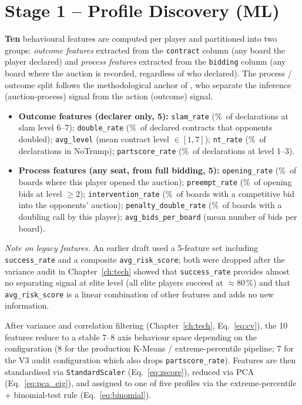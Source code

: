 \documentclass[11pt, a4paper, oneside, openany]{report}
\begin{document}
\section{Stage 1 -- Profile Discovery (ML)}

\textbf{Ten} behavioural features are computed per player and partitioned into two groups: \emph{outcome features} extracted from the \texttt{contract} column (any board the player declared) and \emph{process features} extracted from the \texttt{bidding} column (any board where the auction is recorded, regardless of who declared). The process / outcome split follows the methodological anchor of \citet{rong2019competitive}, who separate the inference (auction-process) signal from the action (outcome) signal.

\begin{itemize}[leftmargin=*]
    \item \textbf{Outcome features (declarer only, 5):}
      \texttt{slam\_rate} (\%\ of declarations at slam level 6--7);
      \texttt{double\_rate} (\%\ of declared contracts that opponents doubled);
      \texttt{avg\_level} (mean contract level $\in [1,7]$);
      \texttt{nt\_rate} (\%\ of declarations in NoTrump);
      \texttt{partscore\_rate} (\%\ of declarations at level 1--3).
    \item \textbf{Process features (any seat, from full bidding, 5):}
      \texttt{opening\_rate} (\%\ of boards where this player opened the auction);
      \texttt{preempt\_rate} (\%\ of opening bids at level $\geq 2$);
      \texttt{intervention\_rate} (\%\ of boards with a competitive bid into the opponents' auction);
      \texttt{penalty\_double\_rate} (\%\ of boards with a doubling call by this player);
      \texttt{avg\_bids\_per\_board} (mean number of bids per board).
\end{itemize}

\textit{Note on legacy features.} An earlier draft used a 5-feature set including \texttt{success\_rate} and a composite \texttt{avg\_risk\_score}; both were dropped after the variance audit in Chapter~\ref{ch:tech} showed that \texttt{success\_rate} provides almost no separating signal at elite level (all elite players succeed at $\approx 80\,\%$) and that \texttt{avg\_risk\_score} is a linear combination of other features and adds no new information.

After variance and correlation filtering (Chapter~\ref{ch:tech}, Eq.~\eqref{eq:cv}), the 10 features reduce to a stable 7--8 axis behaviour space depending on the configuration (8 for the production K-Means / extreme-percentile pipeline; 7 for the V3 audit configuration which also drops \texttt{partscore\_rate}). Features are then standardised via \texttt{StandardScaler} (Eq.~\eqref{eq:zscore}), reduced via PCA (Eq.~\eqref{eq:pca_eig}), and assigned to one of five profiles via the extreme-percentile + binomial-test rule (Eq.~\eqref{eq:binomial}).
\end{document}
